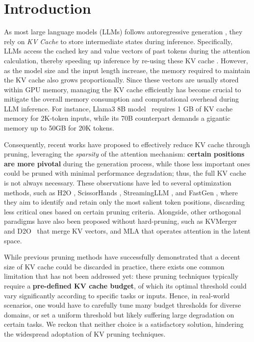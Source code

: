 \section{Introduction}
\label{sec:intro}

As most large language models (LLMs) follows autoregressive generation \cite{DBLP:journals/corr/abs-2402-06196,DBLP:journals/corr/abs-2307-03109,DBLP:journals/corr/abs-2303-08774}, they rely on \textit{KV Cache} to store intermediate states during inference. 
Specifically, LLMs access the cached key and value vectors of past tokens during the attention calculation, thereby speeding up inference by re-using these KV cache \cite{DBLP:conf/nips/VaswaniSPUJGKP17,DBLP:conf/emnlp/AinslieLJZLS23,DBLP:journals/corr/abs-1911-02150}. However, as the model size and the input length increase, the memory required to maintain the KV cache also grows proportionally. 
Since these vectors are usually stored within GPU memory, managing the KV cache efficiently has become crucial to mitigate the overall memory consumption and computational overhead during LLM inference.
For instance, Llama3 8B model~\cite{DBLP:journals/corr/abs-2407-21783} requires 1 GB of KV cache memory for 2K-token inputs, while its 70B counterpart demands a gigantic memory up to 50GB for 20K tokens. 

Consequently, recent works have proposed to effectively reduce KV cache through pruning, leveraging the \emph{sparsity} of the attention mechanism: \textbf{certain positions are more pivotal} during the generation process, while those less important ones could be pruned with minimal performance degradation; thus, the full KV cache is not always necessary.
These observations have led to several optimization methods, such as H2O \cite{DBLP:conf/nips/Zhang00CZC0TRBW23}, ScissorHands \cite{DBLP:conf/nips/LiuDLWXXKS23}, StreamingLLM \cite{DBLP:conf/iclr/XiaoTCHL24}, and FastGen \cite{DBLP:conf/iclr/Ge0LZ0024}, where they aim to identify and retain only the most salient token positions, discarding less critical ones based on certain pruning criteria. 
Alongside, other orthogonal paradigms have also been proposed without hard-pruning, such as KVMerger~\cite{DBLP:journals/corr/abs-2407-08454} and D2O~\cite{DBLP:journals/corr/abs-2406-13035} that merge KV vectors, and MLA \cite{deepseekv2} that operates attention in the latent space.

While previous pruning methods have successfully demonstrated that a decent size of KV cache could be discarded in practice, there exists one common limitation that has not been addressed yet: these pruning techniques typically require a \textbf{pre-defined KV cache budget}, of which its optimal threshold could vary significantly according to specific tasks or inputs. 
Hence, in real-world scenarios, one would have to carefully tune many budget thresholds for diverse domains, or set a uniform threshold but likely suffering large degradation on certain tasks. We reckon that neither choice is a satisfactory solution, hindering the widespread adoptation of KV pruning techniques.

